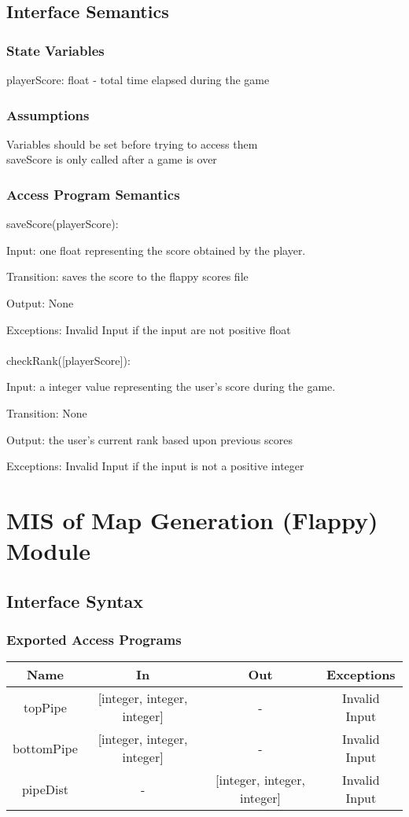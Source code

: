 \documentclass[12pt, titlepage]{article}
\begin{document}
		\subsection{Interface Semantics}
		\subsubsection{State Variables}
		playerScore: float - total time elapsed during the game \\
		
		\subsubsection{Assumptions}
		Variables should be set before trying to access them \\
		saveScore is only called after a game is over
		
		\subsubsection{Access Program Semantics}
		saveScore(playerScore):
		
		Input: one float representing the score obtained by the player. 
		
		Transition: saves the score to the flappy scores file
		
		Output: None
		
		Exceptions: Invalid Input if the input are not positive float \\
		\\
		checkRank([playerScore]):
		
		Input: a integer value representing the user's score during the game.
		
		Transition: None
		
		Output: the user's current rank based upon previous scores
		
		Exceptions: Invalid Input if the input is not a positive integer
		
\section{MIS of Map Generation (Flappy) Module}
		\subsection{Interface Syntax}
		\subsubsection{Exported Access Programs}
		\begin{tabular}[pos]{|c|c|c|c|}
			\hline
			\textbf{Name}& \textbf{In} & \textbf{Out} & \textbf{Exceptions} \\ \hline
			topPipe & [integer, integer, integer] & - & Invalid Input \\ \hline
			bottomPipe & [integer, integer, integer] & - & Invalid Input \\ \hline
			pipeDist & - & [integer, integer, integer] & Invalid Input \\ \hline
			
		\end{tabular}
		
\end{document}

